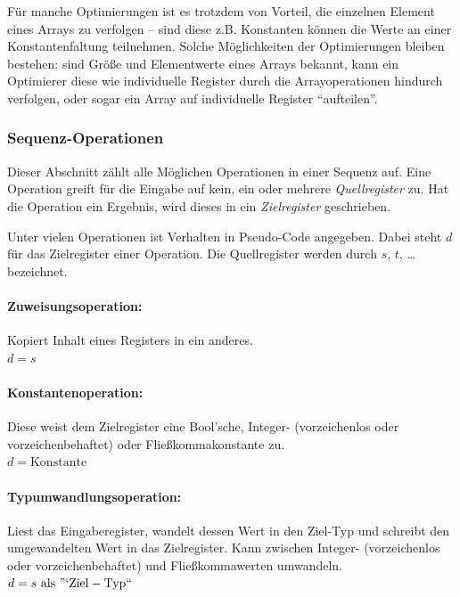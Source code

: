 \documentclass[twoside,a4paper,fleqn,12pt]{article}
\begin{document}
Für manche Optimierungen ist es trotzdem von Vorteil, die einzelnen Element eines Arrays zu verfolgen -- sind diese
z.B. Konstanten können die Werte an einer Konstantenfaltung teilnehmen. Solche Möglichkeiten der Optimierungen
bleiben bestehen: sind Größe und Elementwerte eines Arrays bekannt, kann ein Optimierer diese wie individuelle
Register durch die Arrayoperationen hindurch verfolgen, oder sogar ein Array auf individuelle Register "`aufteilen"'.

\subsubsection{Sequenz-Operationen}

Dieser Abschnitt zählt alle Möglichen Operationen in einer Sequenz auf. Eine Operation greift für die Eingabe auf kein, ein oder mehrere
\emph{Quellregister} zu. Hat die Operation ein Ergebnis, wird dieses in ein \emph{Zielregister} geschrieben. 

Unter vielen Operationen ist Verhalten in Pseudo-Code angegeben. Dabei steht $d$ für das Zielregister einer Operation.
Die Quellregister werden durch $s$, $t$, \dots bezeichnet. 

\paragraph{Zuweisungsoperation:} Kopiert Inhalt eines Registers in ein anderes.
\\\hspace*{1cm}$d = s$

\paragraph{Konstantenoperation:} Diese weist dem Zielregister eine Bool'sche, Integer- (vorzeichenlos oder vorzeichenbehaftet) oder
Fließkommakonstante zu.
\\\hspace*{1cm}$d = \mathrm{Konstante}$

\paragraph{Typumwandlungsoperation:} Liest das Eingaberegister, wandelt dessen Wert in den Ziel-Typ und schreibt den umgewandelten Wert in das Zielregister.
Kann zwischen Integer- (vorzeichenlos oder vorzeichenbehaftet) und Fließkommawerten umwandeln.
\\\hspace*{1cm}$d = s\ \mathrm{als}\ \mathrm{"`Ziel-Typ``}$
\end{document}
